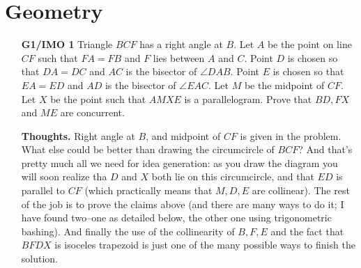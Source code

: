 \documentclass[11pt,a4paper]{article}
\begin{document}
\section{Geometry}
\begin{itemize}
\item[\textbf{G1/IMO 1}]
Triangle $BCF$ has a right angle at $B$. Let $A$ be the point on line $CF$ such that $FA=FB$ and $F$ lies between $A$ and $C$. Point $D$ is chosen so that $DA=DC$ and $AC$ is the bisector of $\angle{DAB}$. Point $E$ is chosen so that $EA=ED$ and $AD$ is the bisector of $\angle{EAC}$. Let $M$ be the midpoint of $CF$. Let $X$ be the point such that $AMXE$ is a parallelogram. Prove that $BD,FX$ and $ME$ are concurrent.

\textbf{Thoughts.} Right angle at $B$, and midpoint of $CF$ is given in the problem. What else could be better than drawing the circumcircle of $BCF$? And that's pretty much all we need for idea generation: as you draw the diagram you will soon realize tha $D$ and $X$ both lie on this circumcircle, and that $ED$ is parallel to $CF$ (which practically means that $M, D, E$ are collinear). The rest of the job is to prove the claims above (and there are many ways to do it; I have found two--one as detailed below, the other one using trigonometric bashing). And finally the use of the collinearity of $B, F, E$ and the fact that $BFDX$ is isoceles trapezoid is just one of the many possible ways to finish the solution. 


\end{itemize}
\end{document}
